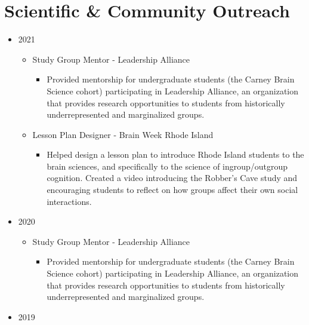 \documentclass[
]{article}
\providecommand{\tightlist}{%
  \setlength{\itemsep}{0pt}\setlength{\parskip}{0pt}}
\begin{document}
\hypertarget{scientific-community-outreach}{%
\section{Scientific \& Community
Outreach}\label{scientific-community-outreach}}

\begin{itemize}
\item
  2021

  \begin{itemize}
  \item
    Study Group Mentor - Leadership Alliance

    \begin{itemize}
    \tightlist
    \item
      Provided mentorship for undergraduate students (the Carney Brain
      Science cohort) participating in Leadership Alliance, an
      organization that provides research opportunities to students from
      historically underrepresented and marginalized groups.
    \end{itemize}
  \item
    Lesson Plan Designer - Brain Week Rhode Island

    \begin{itemize}
    \tightlist
    \item
      Helped design a lesson plan to introduce Rhode Island students to
      the brain sciences, and specifically to the science of
      ingroup/outgroup cognition. Created a video introducing the
      Robber's Cave study and encouraging students to reflect on how
      groups affect their own social interactions.
    \end{itemize}
  \end{itemize}
\item
  2020

  \begin{itemize}
  \item
    Study Group Mentor - Leadership Alliance

    \begin{itemize}
    \tightlist
    \item
      Provided mentorship for undergraduate students (the Carney Brain
      Science cohort) participating in Leadership Alliance, an
      organization that provides research opportunities to students from
      historically underrepresented and marginalized groups.
    \end{itemize}
  \end{itemize}
\item
  2019


\end{itemize}
\end{document}
